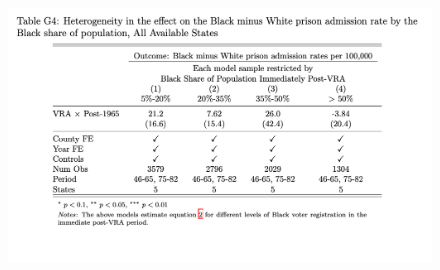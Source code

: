 \documentclass[12pt]{article}
\begin{document}
\begin{figure}
	\centering
	\includegraphics[width=\textwidth]{../../60_appendix_cty_results/table_g4.png}
\end{figure}
\end{document}
